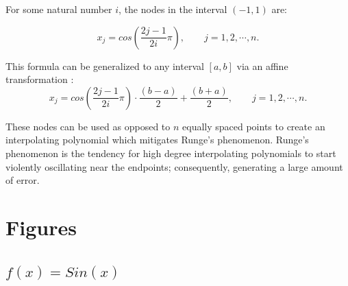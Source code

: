 \documentclass[11pt]{article}%
\begin{document}
For some natural number $i$, the nodes in the interval $(-1, 1)$ are:

\begin{equation} \label{cnode1}
x_j = cos(\frac{2j - 1}{2i}\pi), \qquad j = 1, 2, \cdots, n.
\end{equation}

This formula can be generalized to any interval $[a, b]$ via an affine transformation \cite{SGW}:
\begin{equation} \label{cnode1}
x_j = cos(\frac{2j - 1}{2i}\pi)\cdot \frac{(b-a)}{2} + \frac{(b+a)}{2}, \qquad j = 1, 2, \cdots, n.
\end{equation}

These nodes can be used as opposed to $n$ equally spaced points to create an interpolating polynomial which mitigates Runge's phenomenon. Runge's phenomenon is the tendency for high degree interpolating polynomials to start violently oscillating near the endpoints; consequently, generating a large amount of error.

\clearpage
\newpage
\section*{Figures}

\subsection{$f\left(x\right) = Sin(x)$}
\vspace{5pt}

\end{document}
